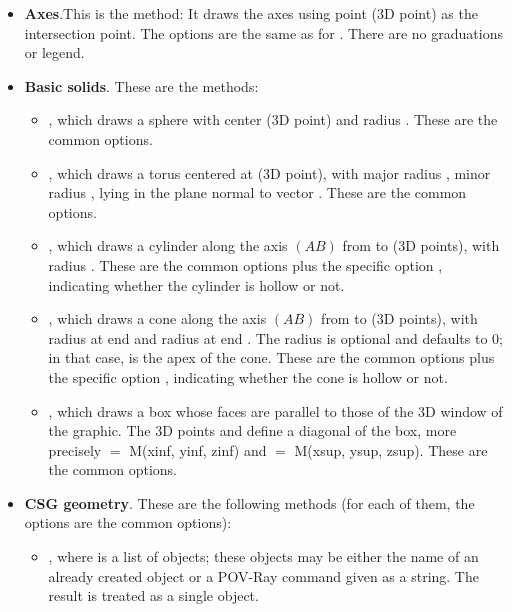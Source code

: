 \begin{itemize}
     \item \textbf{Axes}.This is the method: 
    It draws the axes using point  (3D point) as the intersection point. The options are the same as for . There are no graduations or legend.   
    
    \item \textbf{Basic solids}. These are the methods:
        \begin{itemize}
            \item {}, which draws a sphere with center  (3D point) and radius . These are the common options.
    
            \item {}, which draws a torus centered at  (3D point), with major radius , minor radius , lying in the plane normal to vector . These are the common options.
    
            \item {}, which draws a cylinder along the axis $(AB)$ from  to  (3D points), with radius . These are the common options plus the specific option , indicating whether the cylinder is hollow or not.
    
            \item {}, which draws a cone along the axis $(AB)$ from  to  (3D points), with radius  at end  and radius  at end . The radius  is optional and defaults to \(0\); in that case,  is the apex of the cone. These are the common options plus the specific option , indicating whether the cone is hollow or not.
    
            \item {}, which draws a box whose faces are parallel to those of the 3D window of the graphic. The 3D points  and  define a diagonal of the box, more precisely  $=$ M(xinf, yinf, zinf) and  $=$ M(xsup, ysup, zsup). These are the common options.
        \end{itemize}
            
    \item \textbf{CSG geometry}. These are the following methods (for each of them, the options are the common options):
        \begin{itemize}
            \item {}, where  is a list of \povray objects; these objects may be either the name of an already created object or a POV-Ray command given as a string. The result is treated as a single object.
            

\end{itemize}
\end{itemize}
